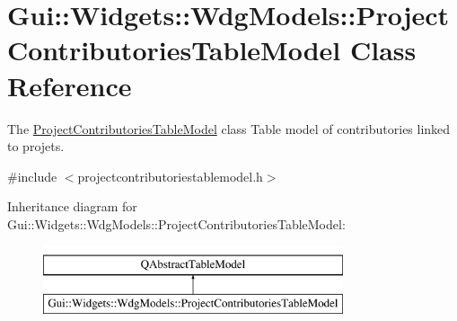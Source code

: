 \hypertarget{classGui_1_1Widgets_1_1WdgModels_1_1ProjectContributoriesTableModel}{\section{Gui\-:\-:Widgets\-:\-:Wdg\-Models\-:\-:Project\-Contributories\-Table\-Model Class Reference}
\label{classGui_1_1Widgets_1_1WdgModels_1_1ProjectContributoriesTableModel}
}


The \hyperlink{classGui_1_1Widgets_1_1WdgModels_1_1ProjectContributoriesTableModel}{Project\-Contributories\-Table\-Model} class Table model of contributories linked to projets.  




{\ttfamily \#include $<$projectcontributoriestablemodel.\-h$>$}

Inheritance diagram for Gui\-:\-:Widgets\-:\-:Wdg\-Models\-:\-:Project\-Contributories\-Table\-Model\-:\begin{figure}[H]
\begin{center}
\leavevmode
\includegraphics[height=2.000000cm]{d9/d71/classGui_1_1Widgets_1_1WdgModels_1_1ProjectContributoriesTableModel}
\end{center}
\end{figure}
